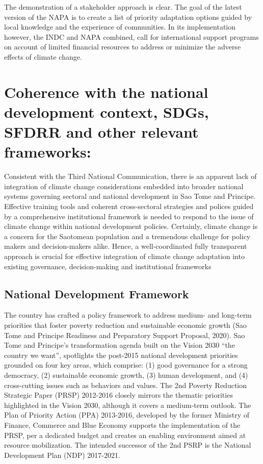 \documentclass[
]{book}
\begin{document}
The demonstration of a stakeholder approach is clear. The goal of the latest version of the NAPA is to create a list of priority adaptation options guided by local knowledge and the experience of communities. In its implementation however, the INDC and NAPA combined, call for international support programs on account of limited financial resources to address or minimize the adverse effects of climate change.

\hypertarget{coherence-with-the-national-development-context-sdgs-sfdrr-and-other-relevant-frameworks-1}{%
\section{Coherence with the national development context, SDGs, SFDRR and other relevant frameworks:}\label{coherence-with-the-national-development-context-sdgs-sfdrr-and-other-relevant-frameworks-1}}

Consistent with the Third National Communication, there is an apparent lack of integration of climate change considerations embedded into broader national systems governing sectoral and national development in Sao Tome and Principe. Effective training tools and coherent cross-sectoral strategies and polices guided by a comprehensive institutional framework is needed to respond to the issue of climate change within national development policies. Certainly, climate change is a concern for the Saotomean population and a tremendous challenge for policy makers and decision-makers alike. Hence, a well-coordinated fully transparent approach is crucial for effective integration of climate change adaptation into existing governance, decision-making and institutional frameworks

\hypertarget{national-development-framework-1}{%
\subsection{National Development Framework}\label{national-development-framework-1}}

The country has crafted a policy framework to address medium- and long-term priorities that foster poverty reduction and sustainable economic growth (Sao Tome and Principe Readiness and Preparatory Support Proposal, 2020). Sao Tome and Principe's transformation agenda built on the Vision 2030 ``the country we want'', spotlights the post-2015 national development priorities grounded on four key areas, which comprise: (1) good governance for a strong democracy, (2) sustainable economic growth, (3) human development, and (4) cross-cutting issues such as behaviors and values. The 2nd Poverty Reduction Strategic Paper (PRSP) 2012-2016 closely mirrors the thematic priorities highlighted in the Vision 2030, although it covers a medium-term outlook. The Plan of Priority Action (PPA) 2013-2016, developed by the former Ministry of Finance, Commerce and Blue Economy supports the implementation of the PRSP, per a dedicated budget and creates an enabling environment aimed at resource mobilization. The intended successor of the 2nd PSRP is the National Development Plan (NDP) 2017-2021.
\end{document}
